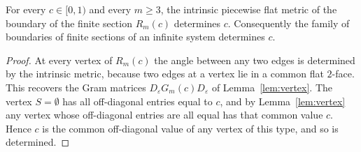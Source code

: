 \begin{theorem}\label{thm:main}
For every $c\in[0,1)$ and every $m\ge3$, the intrinsic piecewise flat metric of the boundary of the finite section $R_m(c)$ determines $c$. Consequently the family of boundaries of finite sections of an infinite system determines $c$.
\end{theorem}
\begin{proof}
At every vertex of $R_m(c)$ the angle between any two edges is determined by the intrinsic metric, because two edges at a vertex lie in a common flat $2$-face. This recovers the Gram matrices $D_\varepsilon G_m(c)D_\varepsilon$ of Lemma~\ref{lem:vertex}.
The vertex $S=\emptyset$ has all off-diagonal entries equal to $c$, and by Lemma~\ref{lem:vertex} any vertex whose off-diagonal entries are all equal has that common value $c$. Hence $c$ is the common off-diagonal value of any vertex of this type, and so is determined.
\end{proof}
